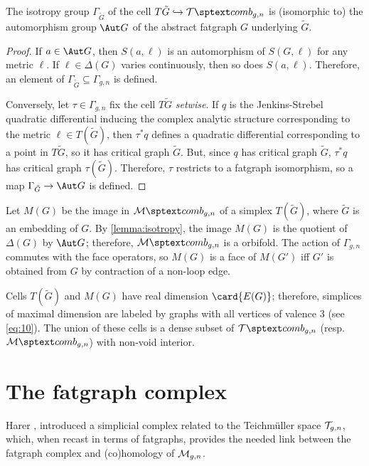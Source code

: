 \begin{lemma}
  \label{lemma:isotropy}
  The isotropy group $\Gamma_{{\tilde G}}$ of the cell $T{\tilde G} \hookrightarrow
  \Tcomb_{g,n}$ is (isomorphic to) the automorphism group $\Aut G$ of
  the abstract fatgraph $G$ underlying ${\tilde G}$.
\end{lemma}
\begin{proof}
  If $a \in \Aut G$, then $S(a, \ell)$ is an automorphism of $S(G, \ell)$ for
  any metric $\ell$.  If $\ell \in \Delta(G)$ varies continuously, then so does
  $S(a, \ell)$.  Therefore, an element of $\Gamma_{{\tilde G}} \subseteq \Gamma_{g,n}$ is defined.

  Conversely, let $\tau \in \Gamma_{g,n}$ fix the cell $T{\tilde G}$
  \emph{setwise}.  If $q$ is the Jenkins-Strebel quadratic
  differential inducing the complex analytic structure corresponding
  to the metric $\ell \in T({\tilde G})$, then $\tau^*q$ defines a quadratic
  differential corresponding to a point in $T{\tilde G}$, so it has
  critical graph ${\tilde G}$.  But, since $q$ has critical graph
  ${\tilde G}$, $\tau^*q$ has critical graph $\tau({\tilde G})$. Therefore,
  $\tau$ restricts to a fatgraph isomorphism, so a map $\Gamma_{{\tilde
      G}} \to \Aut G$ is defined.
\end{proof}
Let $M(G)$ be the image in $\Mcomb_{g,n}$ of a simplex $T({\tilde G})$,
where ${\tilde G}$ is an embedding of $G$.  By \ref{lemma:isotropy},
the image $M(G)$ is the quotient of $\Delta(G)$ by $\Aut G$; therefore,
$\Mcomb_{g,n}$ is a orbifold.
The action of $\Gamma_{g,n}$ commutes with the face operators, so
$M(G)$ is a face of $M(G')$ iff $G'$ is obtained from $G$ by
contraction of a non-loop edge.

Cells $T({\tilde G})$ and $M(G)$ have real dimension
$\card{\Edges{G}}$; therefore, simplices of maximal dimension are
labeled by graphs with all vertices of valence $3$ (see
\eqref{eq:10}). The union of these cells is a dense subset of
$\Tcomb_{g,n}$ (resp.~$\Mcomb_{g,n}$) with non-void interior.



\section{The fatgraph complex}
\label{sec:ribbon-graph-complex}

Harer \cite{harer;cohomological-dimension}, introduced a simplicial
complex related to the Teichm\"uller space $\mathcal{T}_{g,n}$, which, when
recast in terms of fatgraphs, provides the needed link between the
fatgraph complex and (co)homology of $\mathcal{M}_{g,n}$.  


